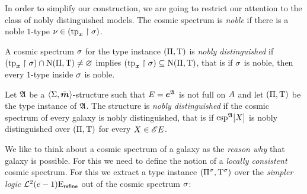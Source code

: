In order to simplify our construction, we are going to restrict our attention
to the class of nobly distinguished models.
The cosmic spectrum is \emph{noble} if there is a noble $1$-type $\nu \in
(\operatorname{tp}_{\bm{x}}\restriction\sigma)$.
\begin{definition}\label{def:nobly-distinguished-csp}
A cosmic spectrum $\sigma$ for the type instance $(\Pi,\mathrm{T})$ is \emph{nobly
distinguished} if $(\operatorname{tp}_{\bm{x}}\restriction\sigma) \cap \mathrm{\mathrm{N}}(\Pi,\mathrm{T}) \neq \varnothing$
implies $(\operatorname{tp}_{\bm{x}}\restriction\sigma) \subseteq \mathrm{\mathrm{N}}(\Pi,\mathrm{T})$, that is if $\sigma$
is noble, then every $1$-type inside $\sigma$ is noble.
\end{definition}
\begin{definition}\label{def:nobly-distinguished-structure}
Let $\mathfrak{A}$ be a $\left\langle \mathrm{\Sigma},\bar{\bm{m}} \right\rangle$-structure such that $E = \bm{e}^{\mathfrak{A}}$ is
not full on $A$ and let $(\Pi,\mathrm{T})$ be the type instance of $\mathfrak{A}$. The
structure is \emph{nobly distinguished} if the cosmic spectrum of every galaxy
is nobly distinguished, that is if $\operatorname{csp}^{\mathfrak{A}}[X]$ is nobly distinguished
over $(\Pi,\mathrm{T})$ for every $X \in {\mathscr{E}E}$.
\end{definition}
We like to think about a cosmic spectrum of a galaxy as the \emph{reason why}
that galaxy is possible. For this we need to define the notion of a
\emph{locally consistent} cosmic spectrum. For this we extract a type instance
$(\Pi^{\sigma},\mathrm{T}^{\sigma})$ over the \emph{simpler logic}
$\mathcal{L}^{2}_{{}}{(e-1)}\mathrm{E}_{\mathsf{refine}}$ out of the cosmic spectrum $\sigma$:
